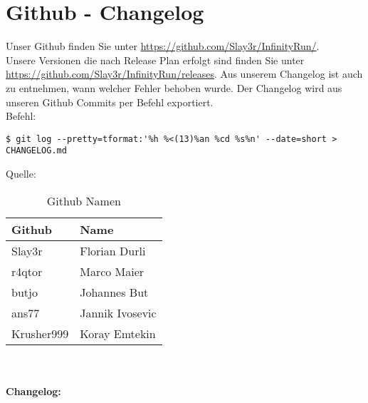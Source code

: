 \chapter{Github - Changelog}
Unser Github finden Sie unter \url{https://github.com/Slay3r/InfinityRun/}.\\
Unsere Versionen die nach Release Plan erfolgt sind finden Sie unter \url{https://github.com/Slay3r/InfinityRun/releases}. Aus unserem Changelog ist auch zu entnehmen, wann welcher Fehler behoben wurde.
Der Changelog wird aus unseren Github Commits per Befehl exportiert.\\
Befehl:
\lstset{language=bash}
\begin{lstlisting}[frame=single]
$ git log --pretty=tformat:'%h %<(13)%an %cd %s%n' --date=short > CHANGELOG.md
\end{lstlisting}
Quelle: \cite{changelog}
\begin{table}[h]
	\centering
	\begin{tabular}{|l|l|}
		\toprule
		\textbf{Github}& \textbf{Name}\\
		\midrule
		Slay3r & Florian Durli 	\\ 
		r4qtor & Marco Maier	\\
		butjo  & Johannes But	\\ 
		ans77  & Jannik Ivosevic\\
		Krusher999 & Koray Emtekin\\
		\bottomrule
	\end{tabular}
	\caption{Github Namen}
\end{table}
\\\\
\textbf{Changelog: }
